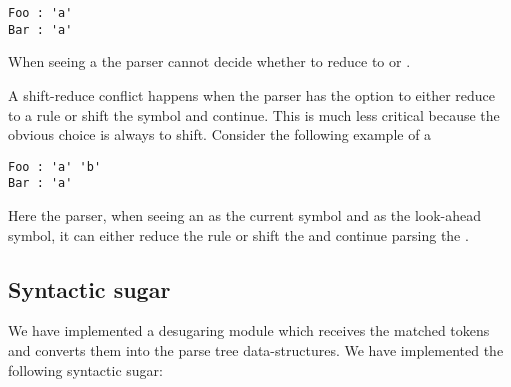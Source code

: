 \begin{lstlisting}
Foo : 'a'
Bar : 'a'
\end{lstlisting}

When seeing a  the parser cannot decide whether to reduce to  or .

A shift-reduce conflict happens when the parser has the option to either reduce to a rule or shift the symbol and continue. This is much less critical because the obvious choice is always to shift. Consider the following example of a

\begin{lstlisting}
Foo : 'a' 'b'
Bar : 'a'
\end{lstlisting}

Here the parser, when seeing an  as the current symbol and  as the look-ahead symbol, it can either reduce the  rule or shift the  and continue parsing the .

\subsection{Syntactic sugar}
\label{sec:imp-sugar}
We have implemented a desugaring module which receives the matched tokens and converts them into the parse tree data-structures. We have implemented the following syntactic sugar:

